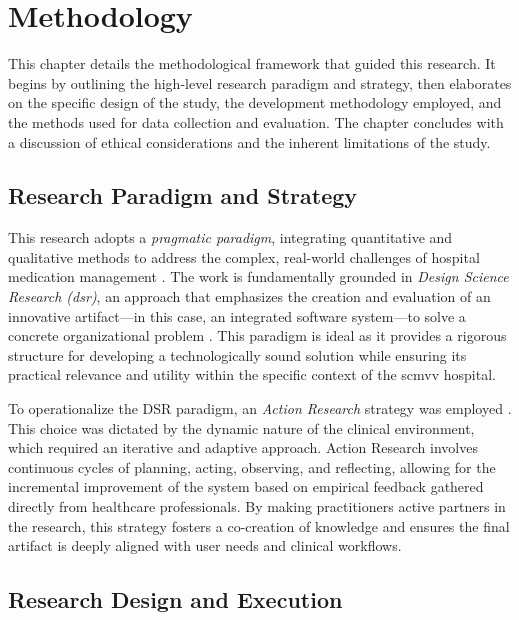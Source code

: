 \chapter{Methodology}
\label{chap:Methodology}

This chapter details the methodological framework that guided this research. It begins by outlining the high-level research paradigm and strategy, then elaborates on the specific design of the study, the development methodology employed, and the methods used for data collection and evaluation. The chapter concludes with a discussion of ethical considerations and the inherent limitations of the study.

\section{Research Paradigm and Strategy}

This research adopts a \textit{pragmatic paradigm}, integrating quantitative and qualitative methods to address the complex, real-world challenges of hospital medication management \cite{venkatesh2003}. The work is fundamentally grounded in \textit{Design Science Research (\gls{dsr})}, an approach that emphasizes the creation and evaluation of an innovative artifact—in this case, an integrated software system—to solve a concrete organizational problem \cite{martin2017}. This paradigm is ideal as it provides a rigorous structure for developing a technologically sound solution while ensuring its practical relevance and utility within the specific context of the \gls{scmvv} hospital.

To operationalize the DSR paradigm, an \textit{Action Research} strategy was employed \cite{greenhalgh2017}. This choice was dictated by the dynamic nature of the clinical environment, which required an iterative and adaptive approach. Action Research involves continuous cycles of planning, acting, observing, and reflecting, allowing for the incremental improvement of the system based on empirical feedback gathered directly from healthcare professionals. By making practitioners active partners in the research, this strategy fosters a co-creation of knowledge and ensures the final artifact is deeply aligned with user needs and clinical workflows.

\section{Research Design and Execution}

